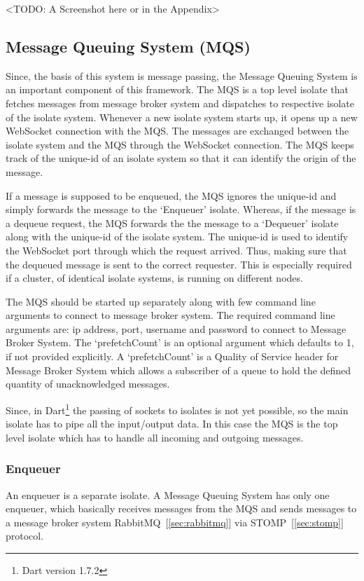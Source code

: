   <TODO: A Screenshot here or in the Appendix>

\subsection{Message Queuing System (MQS)}
\label{subsec:mqs}
  Since, the basis of this system is message passing, the Message Queuing System is an important component of this framework. The MQS is a top level isolate that fetches messages from message broker system and dispatches to respective isolate of the isolate system. Whenever a new isolate system starts up, it opens up a new WebSocket connection with the MQS. The messages are exchanged between the isolate system and the MQS through the WebSocket connection. The MQS keeps track of the unique-id of an isolate system so that it can identify the origin of the message.

  If a message is supposed to be enqueued, the MQS ignores the unique-id and simply forwards the message to the ‘Enqueuer’ isolate. Whereas, if the message is a dequeue request, the MQS forwards the the message to a ‘Dequeuer’ isolate along with the unique-id of the isolate system. The unique-id is used to identify the WebSocket port through which the request arrived. Thus, making sure that the dequeued message is sent to the correct requester. This is especially required if a cluster, of identical isolate systems, is running on different nodes.

  The MQS should be started up separately along with few command line arguments to connect to message broker system. The required command line arguments are: ip address, port, username and password to connect to Message Broker System. The ‘prefetchCount’ is an optional argument which defaults to 1, if not provided explicitly. A ‘prefetchCount’ is a Quality of Service header for Message Broker System which allows a subscriber of a queue to hold the defined quantity of unacknowledged messages.

Since, in Dart\footnote{Dart version 1.7.2} the passing of sockets to isolates is not yet possible, so the main isolate has to pipe all the input/output data. In this case the MQS is the top level isolate which has to handle all incoming and outgoing messages.

  \subsubsection{Enqueuer}
  An enqueuer is a separate isolate. A Message Queuing System has only one enqueuer, which basically receives messages from the MQS and sends messages to a message broker system \textendash{} RabbitMQ~[\ref{sec:rabbitmq}] via STOMP~[\ref{sec:stomp}] protocol.

